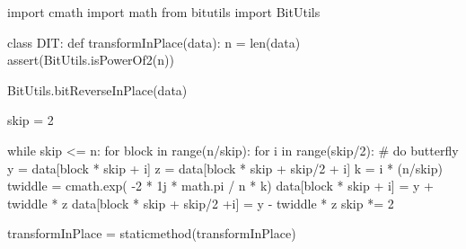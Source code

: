 \begin{python}
import cmath
import math
from bitutils import BitUtils

class DIT:
    def transformInPlace(data):
        n = len(data)
        assert(BitUtils.isPowerOf2(n))

        BitUtils.bitReverseInPlace(data)

        skip = 2

        while skip <= n:
            for block in range(n/skip):
                for i in range(skip/2):
                    # do butterfly
                    y = data[block * skip + i]
                    z = data[block * skip + skip/2 + i]
                    k = i * (n/skip)
                    twiddle = cmath.exp( -2 * 1j * math.pi / n * k)
                    data[block * skip + i] = y + twiddle * z
                    data[block * skip + skip/2 +i] = y - twiddle * z
            skip *= 2


    transformInPlace = staticmethod(transformInPlace)
\end{python}    
